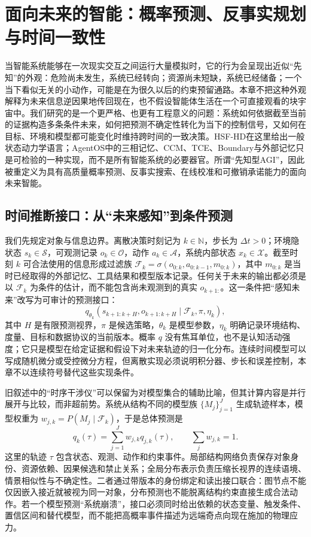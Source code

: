 \chapter{面向未来的智能：概率预测、反事实规划与时间一致性}

当智能系统能够在一次现实交互之间运行大量模拟时，它的行为会呈现出近似“先知”的外观：危险尚未发生，系统已经转向；资源尚未短缺，系统已经储备；一个当下看似无关的小动作，可能是在为很久以后的约束预留通路。本章不把这种外观解释为未来信息逆因果地传回现在，也不假设智能体生活在一个可直接观看的块宇宙中。我们研究的是一个更严格、也更有工程意义的问题：系统如何依据截至当前的证据构造多条条件未来，如何把预测不确定性转化为当下的控制信号，又如何在目标、环境和模型都可能变化时维持跨时间的一致决策。HSF-HD在这里给出一般状态动力学语言；AgentOS中的三相记忆、CCM、TCE、Boundary与外部记忆只是可检验的一种实现，而不是所有智能系统的必要器官。所谓“先知型AGI”，因此被重定义为具有高质量概率预测、反事实搜索、在线校准和可撤销承诺能力的面向未来智能。

\section{时间推断接口：从“未来感知”到条件预测}

我们先规定对象与信息边界。离散决策时刻记为 $k\in\mathbb{N}$，步长为 $\Delta t>0$；环境隐状态 $s_k\in\mathcal{S}$，可观测记录 $o_k\in\mathcal{O}$，动作 $a_k\in\mathcal{A}$，系统内部状态 $x_k\in\mathcal{X}$。截至时刻 $k$ 可合法使用的信息形成过滤族 $\mathcal{F}_k=\sigma(o_{0:k},a_{0:k-1},m_{0:k})$，其中 $m_{0:k}$ 是当时已经取得的外部记忆、工具结果和模型版本记录。任何关于未来的输出都必须是以 $\mathcal{F}_k$ 为条件的估计，而不能包含尚未观测到的真实 $o_{k+1:}$。这一条件把“感知未来”改写为可审计的预测接口：
\[
q_{\theta_k}(s_{k+1:k+H},o_{k+1:k+H}\mid \mathcal{F}_k,\pi,\eta_k),
\]
其中 $H$ 是有限预测视界，$\pi$ 是候选策略，$\theta_k$ 是模型参数，$\eta_k$ 明确记录环境结构、度量、目标和数据协议的当前版本。概率 $q$ 没有焦耳单位，也不是认知活动强度；它只是模型在给定证据和假设下对未来轨迹的归一化分布。连续时间模型可以写成随机微分或受控微分方程，但离散实现必须说明积分器、步长和误差控制，本章不以连续符号替代这些实现条件。

旧叙述中的“时序干涉仪”可以保留为对模型集合的辅助比喻，但其计算内容是并行展开与比较，而非超前势。系统从结构不同的模型族 $\{M_j\}_{j=1}^{J}$ 生成轨迹样本，模型权重为 $w_{j,k}=P(M_j\mid\mathcal{F}_k)$，于是总体预测是
\[
q_k(\tau)=\sum_{j=1}^{J}w_{j,k}q_{j,k}(\tau),\qquad
\sum_j w_{j,k}=1.
\]
这里的轨迹 $\tau$ 包含状态、观测、动作和约束事件。局部结构网络负责保存对象身份、资源依赖、因果候选和禁止关系；全局分布表示负责压缩长视界的连续语境、情景相似性与不确定性。二者通过带版本的身份绑定和读出接口联合：图节点不能仅因嵌入接近就被视为同一对象，分布预测也不能脱离结构约束直接生成合法动作。若一个模型预测“系统崩溃”，接口必须同时给出依赖的状态变量、触发条件、置信区间和替代模型，而不能把高概率事件描述为远端奇点向现在施加的物理应力。


